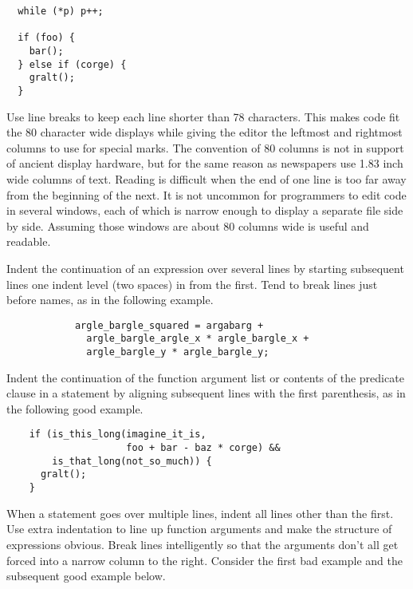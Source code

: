 \documentclass{lulu}
\begin{document}
\begin{samepage}
\begin{verbatim}
  while (*p) p++;

  if (foo) {
    bar();
  } else if (corge) {
    gralt();
  }
\end{verbatim}
\end{samepage}

Use line breaks to keep each line shorter than 78 characters.  This
makes code fit the 80 character wide displays while giving the editor
the leftmost and rightmost columns to use for special marks.  The
convention of 80 columns is not in support of ancient display
hardware, but for the same reason as newspapers use 1.83 inch wide
columns of text.  Reading is difficult when the end of one line is too
far away from the beginning of the next.  It is not uncommon for
programmers to edit code in several windows, each of which is narrow
enough to display a separate file side by side.  Assuming those
windows are about 80 columns wide is useful and readable.

Indent the continuation of an expression over several lines by
starting subsequent lines one indent level (two spaces) in from the
first.  Tend to break lines just before names, as in the following
example.

\begin{samepage}
\begin{verbatim}
            argle_bargle_squared = argabarg +
              argle_bargle_argle_x * argle_bargle_x +
              argle_bargle_y * argle_bargle_y;
\end{verbatim}
\end{samepage}

Indent the continuation of the function argument list or contents of
the predicate clause in a statement by aligning subsequent lines with
the first parenthesis, as in the following good example.

\begin{samepage}
\begin{verbatim}
    if (is_this_long(imagine_it_is,
                     foo + bar - baz * corge) &&
        is_that_long(not_so_much)) {
      gralt();
    }
\end{verbatim}
\end{samepage}

When a statement goes over multiple lines, indent all lines other than
the first.  Use extra indentation to line up function arguments and
make the structure of expressions obvious.  Break lines intelligently
so that the arguments don't all get forced into a narrow column to the
right.  Consider the first bad example and the subsequent good example
below.
\end{document}
